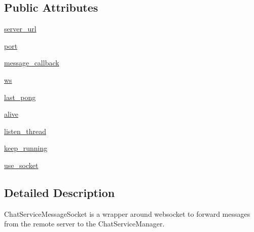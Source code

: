 \subsection*{Public Attributes}
\begin{DoxyCompactItemize}
\item 
\hyperlink{classparlai_1_1chat__service_1_1core_1_1manager__utils_1_1ChatServiceMessageSocket_a42860d1afbafa3cb98688feae503bcef}{server\+\_\+url}
\item 
\hyperlink{classparlai_1_1chat__service_1_1core_1_1manager__utils_1_1ChatServiceMessageSocket_a0dfdf8ef9c7388e55d7c174ee01fc572}{port}
\item 
\hyperlink{classparlai_1_1chat__service_1_1core_1_1manager__utils_1_1ChatServiceMessageSocket_a8a28e261f70852625b02a1ec5c18356a}{message\+\_\+callback}
\item 
\hyperlink{classparlai_1_1chat__service_1_1core_1_1manager__utils_1_1ChatServiceMessageSocket_a40815e1425dd12525060427d99c85b78}{ws}
\item 
\hyperlink{classparlai_1_1chat__service_1_1core_1_1manager__utils_1_1ChatServiceMessageSocket_a548c52469eba4c8a4d5d047caf031d05}{last\+\_\+pong}
\item 
\hyperlink{classparlai_1_1chat__service_1_1core_1_1manager__utils_1_1ChatServiceMessageSocket_a56247cb3af9fce17b726e63f43d30914}{alive}
\item 
\hyperlink{classparlai_1_1chat__service_1_1core_1_1manager__utils_1_1ChatServiceMessageSocket_a5a78df442fb45c0d0e099b59833d8216}{listen\+\_\+thread}
\item 
\hyperlink{classparlai_1_1chat__service_1_1core_1_1manager__utils_1_1ChatServiceMessageSocket_a34cf8032c69d53ba0539c355d52d7aff}{keep\+\_\+running}
\item 
\hyperlink{classparlai_1_1chat__service_1_1core_1_1manager__utils_1_1ChatServiceMessageSocket_af1c65756d630bd95b2cced749cabbb4d}{use\+\_\+socket}
\end{DoxyCompactItemize}


\subsection{Detailed Description}
\begin{DoxyVerb}ChatServiceMessageSocket is a wrapper around websocket to forward messages from the
remote server to the ChatServiceManager.
\end{DoxyVerb}
 

